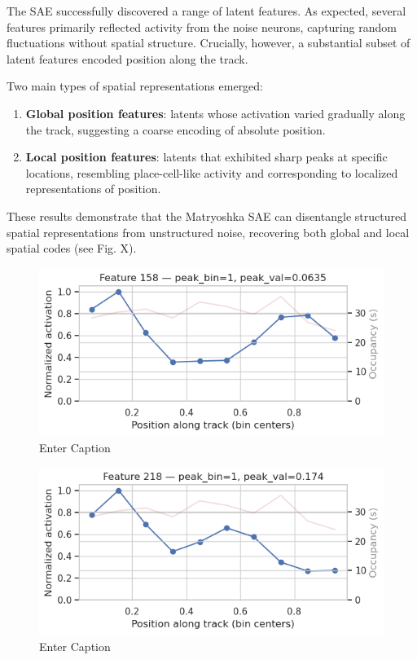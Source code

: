 The SAE successfully discovered a range of latent features. As expected, several features primarily reflected activity from the noise neurons, capturing random fluctuations without spatial structure. Crucially, however, a substantial subset of latent features encoded position along the track.

Two main types of spatial representations emerged:
\begin{enumerate}
    \item \textbf{Global position features}: latents whose activation varied gradually along the track, suggesting a coarse encoding of absolute position.
    \item \textbf{Local position features}: latents that exhibited sharp peaks at specific locations, resembling place-cell-like activity and corresponding to localized representations of position.
\end{enumerate}

These results demonstrate that the Matryoshka SAE can disentangle structured spatial representations from unstructured noise, recovering both global and local spatial codes (see Fig. X).

\begin{figure}
    \centering
    \includegraphics[width=0.5\linewidth]{figures/global_position_latent_1.png}
    \caption{Enter Caption}
    \label{fig:placeholder}
\end{figure}

\begin{figure}
    \centering
    \includegraphics[width=0.5\linewidth]{figures/global_position_latent_2.png}
    \caption{Enter Caption}
    \label{fig:placeholder}
\end{figure}